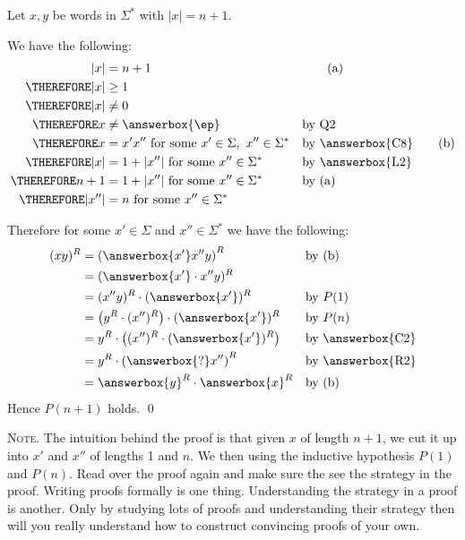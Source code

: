 Let $x,y$ be words in $\Sigma^*$ with $|x| = n + 1$.

We have the following:
\begin{align*}
           |x| &= n + 1                                                   & & \tag{a} \\ 
\THEREFORE |x| &\geq 1 \\
\THEREFORE |x| &\neq 0 \\
\THEREFORE x &\neq \answerbox{\ep}                                          & & \text{by Q2} \\
\THEREFORE x &= x'x'' \text{ for some } x' \in \Sigma, \ x'' \in \Sigma^* & & \text{by \answerbox{C8}} \tag{b} \\
\THEREFORE |x| &= 1 + |x''| \text{ for some } x'' \in \Sigma^*            & & \text{by \answerbox{L2}} \\
\THEREFORE n + 1 &= 1 + |x''| \text{ for some } x'' \in \Sigma^*          & & \text{by (a)} \\
\THEREFORE |x''| &= n \text{ for some } x'' \in \Sigma^*
\end{align*}

Therefore for some $x' \in \Sigma$ and $x'' \in \Sigma^*$
we have the following:
\begin{align*}
(xy)^R
&= \left( \answerbox{x'}x'' y \right)^R                      & & \text{by (b)} \\
&= (\answerbox{x'} \cdot x''y)^R                                               \\
&= (x''y)^R \cdot (\answerbox{x'})^R                         & & \text{by $P(1)$}\\
&= \left( y^R \cdot (x'')^R \right) \cdot (\answerbox{x'})^R & & \text{by $P(n)$} \\
&= y^R \cdot \left( (x'')^R \cdot (\answerbox{x'})^R \right) & & \text{by \answerbox{C2}}\\
&= y^R \cdot \left( \answerbox{?}x'' \right)^R              & & \text{by \answerbox{R2}}\\
&= \answerbox{y}^R \cdot \answerbox{x}^R                    & & \text{by (b)} 
\end{align*}
Hence $P(n+1)$ holds.
\qed


\textsc{Note.}
The intuition behind the proof is that 
given $x$ of length $n + 1$,
we cut it up into $x'$ and $x''$ of lengths 1 and $n$.
We then using the inductive hypothesis $P(1)$ and $P(n)$.
Read over the proof again and make sure the see the strategy
in the proof.
Writing proofs formally is one thing.
Understanding the strategy in a proof is another.
Only by studying lots of proofs and understanding their strategy
then will you really understand how to construct convincing proofs
of your own.
